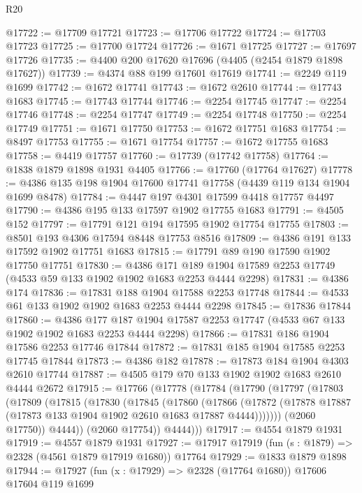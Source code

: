 \begin{lexlean}{R20}
\begin{coremodule}
@17722 := @17709 @17721
@17723 := @17706 @17722
@17724 := @17703 @17723
@17725 := @17700 @17724
@17726 := @1671 @17725
@17727 := @17697 @17726
@17735 := @4400 @200 @17620 @17696 (@4405 (@2454 @1879 @1898 @17627))
@17739 := @4374 @88 @199 @17601 @17619
@17741 := @2249 @119 @1699
@17742 := @1672 @17741
@17743 := @1672 @2610
@17744 := @17743 @1683
@17745 := @17743 @17744
@17746 := @2254 @17745
@17747 := @2254 @17746
@17748 := @2254 @17747
@17749 := @2254 @17748
@17750 := @2254 @17749
@17751 := @1671 @17750
@17753 := @1672 @17751 @1683
@17754 := @8497 @17753
@17755 := @1671 @17754
@17757 := @1672 @17755 @1683
@17758 := @4419 @17757
@17760 := @17739 (@17742 @17758)
@17764 := @1838 @1879 @1898 @1931 @4405
@17766 := @17760 (@17764 @17627)
@17778 := @4386 @135 @198 @1904 @17600 @17741 @17758 (@4439 @119 @134 @1904 @1699 @8478)
@17784 := @4447 @197 @4301 @17599 @4418 @17757 @4497
@17790 := @4386 @195 @133 @17597 @1902 @17755 @1683
@17791 := @4505 @152
@17797 := @17791 @121 @194 @17595 @1902 @17754 @17755
@17803 := @8501 @193 @4306 @17594 @8448 @17753 @8516
@17809 := @4386 @191 @133 @17592 @1902 @17751 @1683
@17815 := @17791 @89 @190 @17590 @1902 @17750 @17751
@17830 := @4386
    @171
    @189
    @1904
    @17589
    @2253
    @17749
    (@4533 @59 @133 @1902 @1902 @1683 @2253 @4444 @2298)
@17831 := @4386 @174
@17836 := @17831 @188 @1904 @17588 @2253 @17748
@17844 := @4533 @61 @133 @1902 @1902 @1683 @2253 @4444 @2298
@17845 := @17836 @17844
@17860 := @4386
    @177
    @187
    @1904
    @17587
    @2253
    @17747
    (@4533 @67 @133 @1902 @1902 @1683 @2253 @4444 @2298)
@17866 := @17831 @186 @1904 @17586 @2253 @17746 @17844
@17872 := @17831 @185 @1904 @17585 @2253 @17745 @17844
@17873 := @4386 @182
@17878 := @17873 @184 @1904 @4303 @2610 @17744
@17887 := @4505 @179 @70 @133 @1902 @1902 @1683 @2610 @4444 @2672
@17915 := @17766
    (@17778
      (@17784
        (@17790
          (@17797
            (@17803
              (@17809
                (@17815
                  (@17830
                    (@17845
                      (@17860
                        (@17866
                          (@17872
                            (@17878 @17887 (@17873 @133 @1904 @1902 @2610 @1683 @17887 @4444)))))))
                  (@2060 @17750))
                @4444))
            (@2060 @17754))
          @4444)))
@17917 := @4554 @1879 @1931
@17919 := @4557 @1879 @1931
@17927 := @17917 @17919 (fun (s : @1879) => @2328 (@4561 @1879 @17919 @1680)) @17764
@17929 := @1833 @1879 @1898
@17944 := @17927
    (fun (x : @17929) => @2328 (@17764 @1680))
    @17606
    @17604
    @119
    @1699

\end{coremodule}
\end{lexlean}
